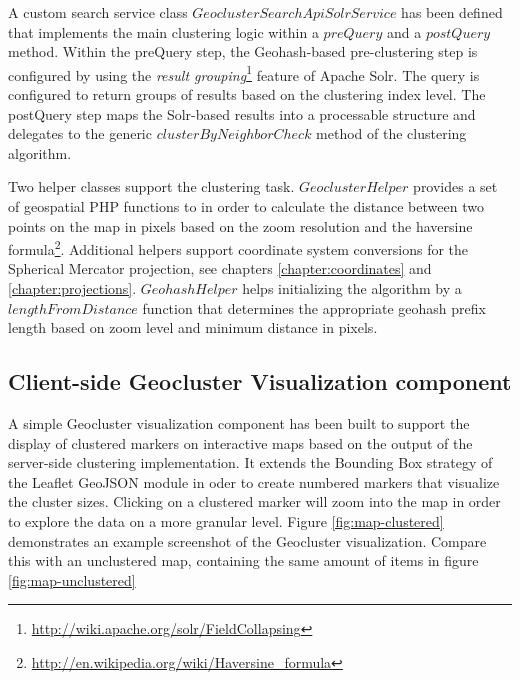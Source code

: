 \begin{itemize}
A custom search service class $GeoclusterSearchApiSolrService$ has been defined that implements the main clustering logic within a $preQuery$ and a $postQuery$ method. Within the preQuery step, the Geohash-based pre-clustering step is configured by using the \textit{result grouping}\footnote{\url{http://wiki.apache.org/solr/FieldCollapsing}} feature of Apache Solr. The query is configured to return groups of results based on the clustering index level. The postQuery step maps the Solr-based results into a processable structure and delegates to the generic $clusterByNeighborCheck$ method of the clustering algorithm.

\end{itemize}

Two helper classes support the clustering task. $GeoclusterHelper$ provides a set of geospatial PHP functions to in order to calculate the distance between two points on the map in pixels based on the zoom resolution and the haversine formula\footnote{\url{http://en.wikipedia.org/wiki/Haversine_formula}}. Additional helpers support coordinate system conversions for the Spherical Mercator projection, see chapters \ref{chapter:coordinates} and \ref{chapter:projections}. $GeohashHelper$ helps initializing the algorithm by a $lengthFromDistance$ function that determines the appropriate geohash prefix length based on zoom level and minimum distance in pixels.


\subsection{Client-side Geocluster Visualization component}
\label{chapter:geocluster-vis}

A simple Geocluster visualization component has been built to support the display of clustered markers on interactive maps based on the output of the server-side clustering implementation. It extends the Bounding Box strategy of the Leaflet GeoJSON module in oder to create numbered markers that visualize the cluster sizes. Clicking on a clustered marker will zoom into the map in order to explore the data on a more granular level. Figure \ref{fig:map-clustered} demonstrates an example screenshot of the Geocluster visualization. Compare this with an unclustered map, containing the same amount of items in figure \ref{fig:map-unclustered}

